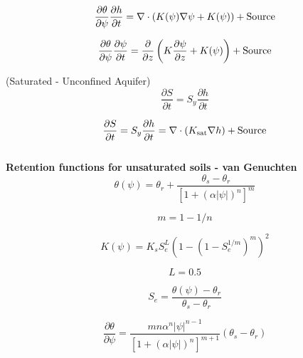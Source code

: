 \documentclass{article}
\begin{document}
\begin{equation}
     \frac{\partial \theta}{\partial \psi}\frac{\partial h}{\partial t} = \nabla \cdot \left( {K(\psi) \nabla \psi} + K(\psi) \right) + {\rm Source}
\label{Richards_simple_uns}
\end{equation}

\begin{equation}
     \frac{\partial \theta}{\partial \psi}\frac{\partial \psi}{\partial t} = \frac{\partial}{\partial z}  \left( {K \frac{\partial \psi}{\partial z} + K(\psi)} \right) + {\rm Source}
\label{Richards_simple_uns_1D}
\end{equation}

(Saturated - Unconfined Aquifer)
\begin{equation}
     \frac{\partial S}{\partial t} = S_y \frac{\partial h}{\partial t}  
\end{equation}

\begin{equation}
     \frac{\partial S}{\partial t} = S_y \frac{\partial h}{\partial t} = \nabla \cdot \left( {K_{\rm sat} \nabla h} \right) + {\rm Source}
\label{Richards_simple}
\end{equation} \\


\textbf{Retention functions for unsaturated soils - van Genuchten} \\


\begin{equation}
     \theta(\psi) = \theta_r + \frac{\theta_s - \theta_r}{\left[ 1+(\alpha |\psi|)^n \right]^{m}}
\end{equation}

\begin{equation}
m=1-1/n
\end{equation}

\begin{equation}
     K(\psi) = K_{s} S_e^L \left (1 -  (1-S_e^{1/m})^m  \right)^2
\end{equation}

\begin{equation}
L = 0.5
\end{equation}

\begin{equation}
     S_e = \frac{\theta(\psi) - \theta_r}{\theta_s - \theta_r}
\end{equation}

\begin{equation}
     \frac{\partial \theta}{\partial \psi} =   \frac{m n\alpha^n |\psi|^{n-1}}{\left[ 1+(\alpha |\psi|)^n \right]^{m+1}} \left( \theta_s - \theta_r \right) 
\end{equation}
\end{document}
